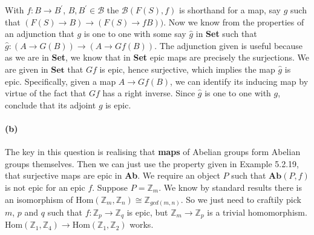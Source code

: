 \documentclass{article}
\begin{document}
With $f\colon B \rightarrow B^\prime$, $B,B^\prime \in \mathcal{B}$ the $\mathcal{B}(F(S), f)$ is shorthand for a map, say $g$ such that $(F(S) \rightarrow B) \rightarrow (F(S) \rightarrow fB))$. Now we know from the properties of an adjunction that $g$ is one to one with some say $\hat{g}$ in \textbf{Set} such that $\hat{g}\colon (A \rightarrow G(B)) \rightarrow (A \rightarrow Gf(B))$. The adjunction given is useful because as we are in \textbf{Set}, we know that in \textbf{Set} epic maps are precisely the surjections.
We are given in $\mathbf{Set}$ that $Gf$ is epic, hence surjective, which implies the map $\hat{g}$ is epic. Specifically, given a map $A \rightarrow Gf(B)$, we can identify its inducing map by virtue of the fact that $Gf$ has a right inverse. Since $\hat{g}$ is one to one with $g$, conclude that its adjoint $g$ is epic.

\paragraph{(b)}

The key in this question is realising that \textbf{maps} of Abelian groups form Abelian groups themselves. Then we can just use the property given in Example 5.2.19, that surjective maps are epic in \textbf{Ab}. We require an object $P$ such that $\mathbf{Ab}(P,f)$ is not epic for an epic $f$. Suppose $P=\mathds{Z}_m$. We know by standard results there is an isomorphism of $\text{Hom}(\mathds{Z}_m, \mathds{Z}_n) \cong \mathds{Z}_{gcd(m,n)}$. So we just need to craftily pick $m$, $p$ and $q$ such that $f\colon\mathds{Z}_p \rightarrow \mathds{Z}_q$ is epic, but $\mathds{Z}_m \rightarrow \mathds{Z}_p$ is a trivial homomorphism. $\text{Hom}(\mathds{Z}_{1},\mathds{Z}_{4}) \rightarrow \text{Hom}(\mathds{Z}_{1},\mathds{Z}_2)$ works.
\end{document}
